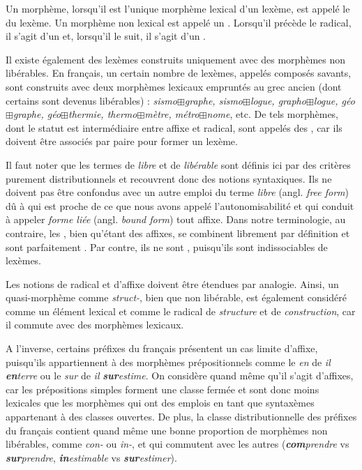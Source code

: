{Un morphème, lorsqu’il est l’unique morphème lexical d’un lexème, est appelé le  du lexème. Un morphème non lexical est appelé un . Lorsqu’il précède le radical, il s’agit d’un  et, lorsqu’il le suit, il s'agit d’un .}

Il existe également des lexèmes construits uniquement avec des morphèmes non libérables. En français, un certain nombre de lexèmes, appelés composés savants, sont construits avec deux morphèmes lexicaux empruntés au grec ancien (dont certains sont devenus libérables) : \textit{sismo}${\boxplus}$\textit{graphe, sismo}${\boxplus}$\textit{logue, grapho}${\boxplus}$\textit{logue, géo}${\boxplus}$\textit{graphe, géo}${\boxplus}$\textit{thermie, thermo}${\boxplus}$\textit{mètre, métro}${\boxplus}$\textit{nome}, etc. De tels morphèmes, dont le statut est intermédiaire entre affixe et radical, sont appelés des , car ils doivent être associés par paire pour former un lexème.

Il faut noter que les termes de \textit{libre} et de \textit{libérable} sont définis ici par des critères purement distributionnels et recouvrent donc des notions syntaxiques. Ils ne doivent pas être confondus avec un autre emploi du terme \textit{libre} (angl. \textit{free form}) dû à \citet[§11.5]{bloomfield1933language} qui est proche de ce que nous avons appelé l’autonomisabilité et qui conduit à appeler \textit{forme liée} (angl. \textit{bound form}) tout affixe. Dans notre terminologie, au contraire, les , bien qu’étant des affixes, se combinent librement par définition et sont parfaitement . Par contre, ils ne sont , puisqu’ils sont indissociables de lexèmes.

Les notions de radical et d’affixe doivent être étendues par analogie. Ainsi, un quasi-morphème comme \textit{struct-}, bien que non libérable, est également considéré comme un élément lexical et comme le radical de \textit{structure} et de \textit{construction}, car il commute avec des morphèmes lexicaux.

A l’inverse, certains préfixes du français présentent un cas limite d’affixe, puisqu’ils appartiennent à des morphèmes prépositionnels comme le \textit{en} de \textit{il} \textbf{\textit{en}}\textit{terre} ou le \textit{sur} de \textit{il} \textbf{\textit{sur}}\textit{estime}. On considère quand même qu’il s’agit d’affixes, car les prépositions simples forment une classe fermée et sont donc moins lexicales que les morphèmes qui ont des emplois en tant que syntaxèmes appartenant à des classes ouvertes. De plus, la classe distributionnelle des préfixes du français contient quand même une bonne proportion de morphèmes non libérables, comme \textit{con-} ou \textit{in-}, et qui commutent avec les autres (\textbf{\textit{com}}\textit{prendre} vs \textbf{\textit{sur}}\textit{prendre}, \textbf{\textit{in}}\textit{estimable} vs \textbf{\textit{sur}}\textit{estimer}).

